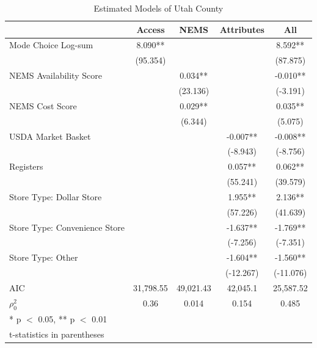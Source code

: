 \documentclass[
  letterpaper,
  authoryear,
  review,
  3p]{elsarticle}
\begin{document}
\hypertarget{tbl-utah-models}{}
\begin{table}
\caption{\label{tbl-utah-models}Estimated Models of Utah County }\tabularnewline

\centering
\begin{tabular}[t]{lcccc}
\toprule
  & Access & NEMS & Attributes & All\\
\midrule
Mode Choice Log-sum & 8.090** &  &  & 8.592**\\
 & (95.354) &  &  & (87.875)\\
NEMS Availability Score &  & 0.034** &  & -0.010**\\
 &  & (23.136) &  & (-3.191)\\
NEMS Cost Score &  & 0.029** &  & 0.035**\\
 &  & (6.344) &  & (5.075)\\
USDA Market Basket &  &  & -0.007** & -0.008**\\
 &  &  & (-8.943) & (-8.756)\\
Registers &  &  & 0.057** & 0.062**\\
 &  &  & (55.241) & (39.579)\\
Store Type: Dollar Store &  &  & 1.955** & 2.136**\\
 &  &  & (57.226) & (41.639)\\
Store Type: Convenience Store &  &  & -1.637** & -1.769**\\
 &  &  & (-7.256) & (-7.351)\\
Store Type: Other &  &  & -1.604** & -1.560**\\
 &  &  & (-12.267) & (-11.076)\\
\midrule
AIC & 31,798.55 & 49,021.43 & 42,045.1 & 25,587.52\\
$\rho^2_0$ & 0.36 & 0.014 & 0.154 & 0.485\\
\bottomrule
\multicolumn{5}{l}{\rule{0pt}{1em}* p $<$ 0.05, ** p $<$ 0.01}\\
\multicolumn{5}{l}{\rule{0pt}{1em}t-statistics in parentheses}\\
\end{tabular}
\end{table}
\end{document}
